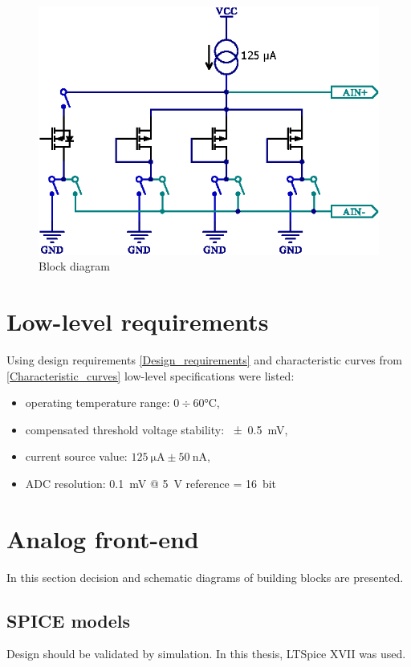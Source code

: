     \begin{figure}[H]
        \centering
        \includegraphics[width=0.7\paperwidth]{img/06/CD4007_mux_schematic.eps}
        \caption{Block diagram}
        \label{sensor_block_diagram}
    \end{figure}

\section{Low-level requirements}
    Using design requirements \ref{Design_requirements} and characteristic curves from \ref{Characteristic_curves} low-level specifications were listed:
    \begin{itemize}
        \item operating temperature range: $0 \div 60 \si{\degreeCelsius}$,
        \item compensated threshold voltage stability: \SI{\pm 0.5}{\milli\volt},
        \item current source value: $\SI{125}{\micro\ampere} \pm \SI{50}{\nano\ampere}$,
        \item ADC resolution: \SI{0.1}{\milli\volt} @ \SI{5}{\volt} reference = \SI{16}{bit}
    \end{itemize}


\section{Analog front-end}
    In this section decision and schematic diagrams of building blocks are presented.

    \subsection{SPICE models}
        Design should be validated by simulation. In this thesis, LTSpice XVII was used.


